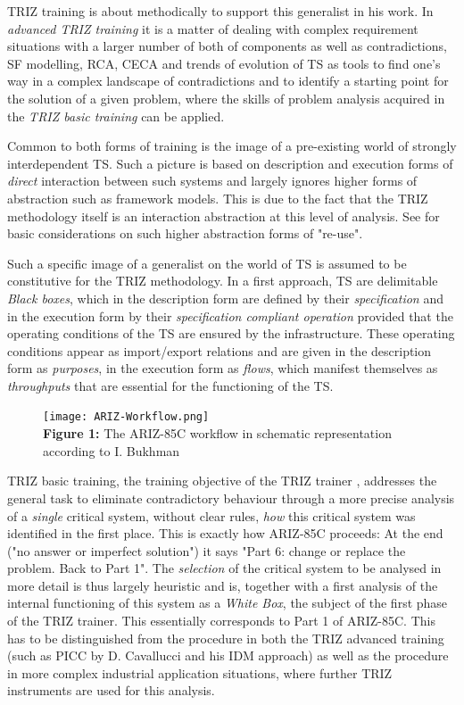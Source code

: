 \documentclass[11pt,a4paper]{article}
\begin{document}
TRIZ training is about methodically to support this generalist in his work. In
\emph{advanced TRIZ training} it is a matter of dealing with complex
requirement situations with a larger number of both of components as well as
contradictions, SF modelling, RCA, CECA and trends of evolution of TS as tools
to find one's way in a complex landscape of contradictions and to identify a
starting point for the solution of a given problem, where the skills of
problem analysis acquired in the \emph{TRIZ basic training} can be applied.

Common to both forms of training is the image of a pre-existing world of
strongly interdependent TS. Such a picture is based on description and
execution forms of \emph{direct} interaction between such systems and largely
ignores higher forms of abstraction such as framework models. This is due to
the fact that the TRIZ methodology itself is an interaction abstraction at
this level of analysis.  See \cite{Szyperski2002} for basic considerations on
such higher abstraction forms of "re-use".

Such a specific image of a generalist on the world of TS is assumed to be
constitutive for the TRIZ methodology.  In a first approach, TS are
delimitable \emph{Black boxes}, which in the description form are defined by
their \emph{specification} and in the execution form by their
\emph{specification compliant operation} provided that the operating
conditions of the TS are ensured by the infrastructure. These operating
conditions appear as import/export relations and are given in the description
form as \emph{purposes}, in the execution form as \emph{flows}, which manifest
themselves as \emph{throughputs} that are essential for the functioning of the
TS.

\begin{figure}[ht]\centering
  \texttt{[image: ARIZ-Workflow.png]}\\
  \textbf{Figure 1:} The ARIZ-85C workflow in schematic representation
  according to I. Bukhman
\end{figure}

TRIZ basic training, the training objective of the TRIZ trainer \cite{TT},
addresses the general task to eliminate contradictory behaviour through a more
precise analysis of a \emph{single} critical system, without clear rules,
\emph{how} this critical system was identified in the first place.  This is
exactly how ARIZ-85C proceeds: At the end ("no answer or imperfect solution")
it says "Part 6: change or replace the problem. Back to Part 1". The
\emph{selection} of the critical system to be analysed in more detail is thus
largely heuristic and is, together with a first analysis of the internal
functioning of this system as a \emph{White Box}, the subject of the first
phase of the TRIZ trainer.  This essentially corresponds to Part 1 of
ARIZ-85C.  This has to be distinguished from the procedure in both the TRIZ
advanced training (such as PICC \cite{Cavallucci} by D. Cavallucci and his IDM
approach) as well as the procedure in more complex industrial application
situations, where further TRIZ instruments are used for this analysis.
\end{document}
